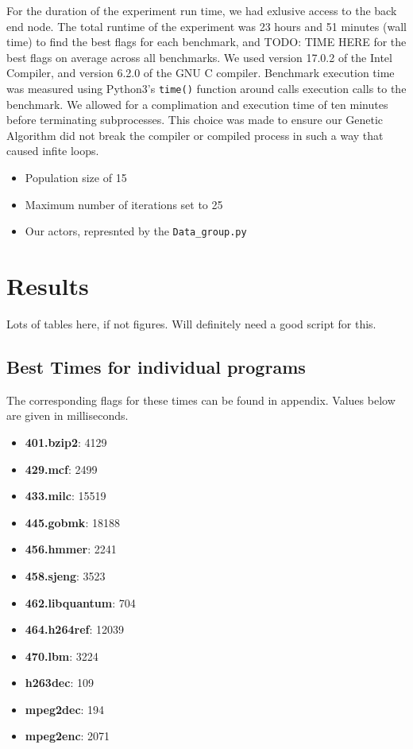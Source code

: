 \documentclass[conference]{IEEEtran}
\begin{document}
For the duration of the experiment run time, we had exlusive access to the back end node. The total runtime of the experiment was 23 hours and 51 minutes (wall time) to find the best flags for each benchmark, and TODO: TIME HERE for the best flags on average across all benchmarks. We used version 17.0.2 of the Intel Compiler, and version 6.2.0 of the GNU C compiler.  Benchmark execution time was measured using Python3's \texttt{time()} function around calls execution calls to the benchmark. We allowed for a complimation and execution time of ten minutes before terminating subprocesses. This choice was made to ensure our Genetic Algorithm did not break the compiler or compiled process in such a way that caused infite loops.
\begin{itemize}
  \item Population size of 15
  \item Maximum number of iterations set to 25
  \item Our actors, represnted by the \texttt{Data\_group.py}
\end{itemize}

\section{Results}
Lots of tables here, if not figures. Will definitely need a good script for this.

\subsection{Best Times for individual programs}
The corresponding flags for these times can be found in appendix. Values below are given in milliseconds.
\begin{itemize}[]
  \item \textbf{401.bzip2}: 4129
  \item \textbf{429.mcf}: 2499
  \item \textbf{433.milc}: 15519
  \item \textbf{445.gobmk}: 18188
  \item \textbf{456.hmmer}: 2241
  \item \textbf{458.sjeng}: 3523
  \item \textbf{462.libquantum}: 704
  \item \textbf{464.h264ref}: 12039
  \item \textbf{470.lbm}: 3224
  \item \textbf{h263dec}: 109
  \item \textbf{mpeg2dec}: 194
  \item \textbf{mpeg2enc}: 2071
\end{itemize}
\end{document}
